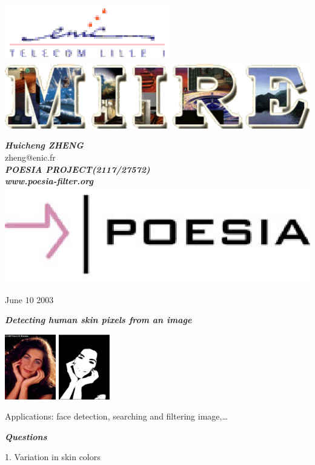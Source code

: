 \documentclass[landscape]{slides}
\def\eniclogo{\includegraphics[height=2EM]{enic.eps}}
\def\miirelogo{\includegraphics[height=1EM]{logomiire.eps}}
\def\poesialogo{\includegraphics[height=1.5EM]{poesiaicon.eps}}
\begin{document}

\begin{center}

\eniclogo \hspace{2em} \miirelogo 

{\bf \em Huicheng ZHENG} \\
zheng@enic.fr \\[0.5em]

{\bf \em POESIA PROJECT(2117/27572)} \\
{\bf \em www.poesia-filter.org} \\
\poesialogo

June $10$ 2003

\end{center}


{\bf \em Detecting human skin pixels from an image}

\hspace*{3em}
\includegraphics[width=6em]{labelimage.eps} \hfill
\includegraphics[width=6em]{labelmask.eps} \hspace*{3em}

Applications: face detection, searching and filtering image,\ldots

{\bf \em {Questions}}

1. Variation in skin colors 

\newcommand{\includewhiteeps}[2][]%
 {\epswhite{\texttt{[image: \#2]}} \epstransparent}
\includewhiteeps[height=5em]{skincolor01.eps} \hfill
\includewhiteeps[height=5em]{skincolor02.eps} \hfill
\includewhiteeps[height=5em]{skincolor03.eps} \hfill
\includewhiteeps[height=5em]{skincolor04.eps} \hfill
\includewhiteeps[height=5em]{skincolor05.eps} \\[1.5em]
\includewhiteeps[height=5em]{skincolor06.eps} \hfill
\includewhiteeps[height=5em]{skincolor07.eps} \hfill
\includewhiteeps[height=5em]{skincolor08.eps} \hfill
\includewhiteeps[height=5em]{skincolor09.eps} \hfill
\includewhiteeps[height=5em]{skincolor10.eps}
\end{document}
